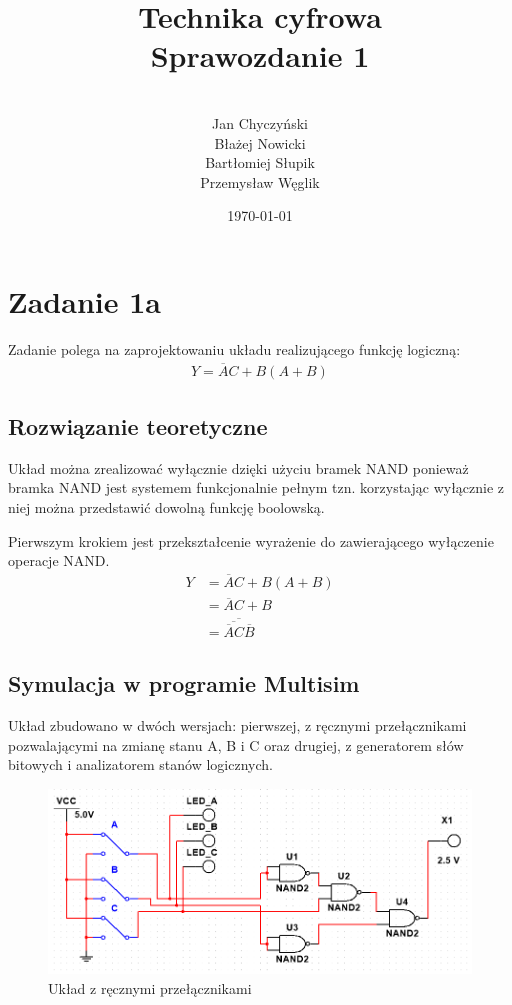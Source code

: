 \documentclass[12pt,a4paper,openright]{mwrep}
\begin{document}
\title{%
Technika cyfrowa\\
Sprawozdanie 1\\
}

\author{\\Jan Chyczyński\\Błażej Nowicki
\\Bartłomiej Słupik\\Przemysław Węglik}

\date{\today}

\maketitle

\chapter{Zadanie 1a}
Zadanie polega na zaprojektowaniu układu realizującego 
funkcję logiczną:
\begin{align*}
    Y = \overline{A}C + B(A + B)
\end{align*}

\section{Rozwiązanie teoretyczne}
Układ można zrealizować wyłącznie dzięki użyciu bramek NAND
ponieważ bramka NAND jest systemem funkcjonalnie pełnym tzn.
korzystając wyłącznie z niej można przedstawić dowolną funkcję
boolowską.

Pierwszym krokiem jest przekształcenie wyrażenie do zawierającego
wyłączenie operacje NAND.
\begin{align*}
    Y &= \overline{A}C + B(A + B) \\
    &= \overline{A}C + B \\
    &= \overline{\overline{\overline{A}C}\overline{B}}
\end{align*}

\section{Symulacja w programie Multisim}
Układ zbudowano w dwóch wersjach: pierwszej, z ręcznymi przełącznikami 
pozwalającymi na zmianę stanu A, B i C oraz drugiej, z generatorem słów bitowych
i analizatorem stanów logicznych.

\begin{figure}[H]
    \centering
    \includegraphics[width=1\textwidth]{images/1a_circuit_simple.png}
    \caption{Układ z ręcznymi przełącznikami}
    \label{rys:1a_circuit_simple}
\end{figure}
\end{document}

